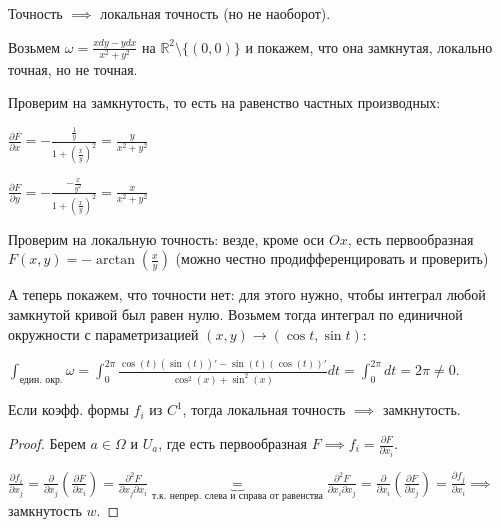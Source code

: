 \begin{remark}
    Точность $\implies$ локальная точность (но не наоборот).

    Возьмем $\omega = \frac{x dy - y dx}{x^2 + y^2}$ на $\mathbb{R}^2 \setminus \{( 0, 0 )\}$ и покажем, что она замкнутая, локально точная, но не точная.

    Проверим на замкнутость, то есть на равенство частных производных:

    $\frac{\partial F}{\partial x} = - \frac{\frac{1}{y}}{1 + (\frac{x}{y})^2} = \frac{y}{x^2 + y^2}$

    $\frac{\partial F}{\partial y} = - \frac{-\frac{x}{y^2}}{1 + (\frac{x}{y})^2} = \frac{x}{x^2 + y^2}$

    Проверим на локальную точность: везде, кроме оси $Ox$, есть первообразная $F(x, y) = -\arctan\left(\frac{x}{y}\right)$ (можно честно продифференцировать и проверить)

    А теперь покажем, что точности нет: для этого нужно, чтобы интеграл любой замкнутой кривой был равен нулю. Возьмем тогда интеграл по единичной окружности с параметризацией $(x, y) \to (\cos t, \sin t)$:

    $\int_{\text{един. окр.}} { \omega } = \int_{0}^{2\pi} { \frac{\cos(t) (\sin(t))' - \sin(t) (\cos(t))'}{\cos^2(x) + \sin^2(x)} dt} = \int_{0}^{2\pi} { dt } = 2\pi \not = 0$.

\end{remark}

\begin{theorem}
    Если коэфф. формы $f_i$ из $C^1$, тогда локальная точность $\implies$ замкнутость.
\end{theorem}
\begin{proof}
    Берем $a \in \Omega$ и $U_a$, где есть первообразная $F \implies f_i = \frac{\partial F}{\partial x_i}$.

    $\frac{\partial f_i}{\partial x_j} = \frac{\partial}{\partial x_j} (\frac{\partial F}{\partial x_i}) = \frac{\partial^2 F}{\partial x_j \partial x_i} \underbrace{=}_{\text{т.к. непрер. слева и справа от равенства}} \frac{\partial^2 F}{\partial x_i \partial x_j} = \frac{\partial}{\partial x_i} \left( \frac{\partial F}{\partial x_j} \right) = \frac{\partial f_j}{\partial x_i} \implies$ замкнутость $w$.
\end{proof}

